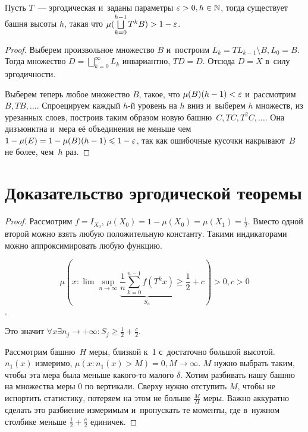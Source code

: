 \documentclass{article}
\begin{document}
\begin{lemma}
	Пусть $T$~--- эргодическая и~заданы параметры $\varepsilon > 0, h \in \mathbb{N}$,
	тогда существует башня высоты $h$, такая что $\mu(\bigsqcup\limits_{k=0}^{h-1}
	T^k B) > 1 - \varepsilon$.
\end{lemma}
\begin{proof}
	Выберем произвольное множество $B$ и~построим $L_k = T L_{k-1} \setminus B,
	L_0 = B$. Тогда множество $D = \bigsqcup_{k=0}^{\infty} L_k$ инвариантно, $TD
	= D$. Отсюда $D = X$ в~силу эргодичности.

	Выберем теперь любое множество $B$, такое, что $\mu(B)(h - 1) <
	\varepsilon$ и~рассмотрим $B, TB, \ldots$. Спроецируем каждый $h$-й уровень на $h$
	вниз и~выберем $h$ множеств, из урезанных слоев, построив таким образом новую
	башню~$C, TC, T^2C, \ldots$. Она дизъюнктна и~мера её объединения не меньше
	чем $1 - \mu(E) = 1 - \mu(B) (h - 1) \leqslant 1 - \varepsilon$, так как ошибочные кусочки
	накрывают~$B$ не более, чем~$h$ раз.
\end{proof}

\section{Доказательство эргодической теоремы}
\begin{proof}
	Рассмотрим $f = I_{X_0}$, $\mu(X_0) = 1 - \mu(X_0) = \mu(X_1) = \frac{1}{2}$.
	Вместо одной второй можно взять любую положительную константу. Такими
	индикаторами можно аппроксимировать любую функцию.

	$$\mu( x: \lim \sup\limits_{n \rightarrow \infty} \underbrace{\frac{1}{n}
	\sum\limits_{k=0}^{n-1} f(T^k x)}_{S_n} \ge \frac{1}{2} + c) > 0, c > 0$$.

	Это значит $\forall x \exists n_j \rightarrow +\infty: S_j \ge \frac{1}{2} +
	\frac{c}{2}$.

	Рассмотрим башню~$H$ меры, близкой к~1 с~достаточно большой высотой. $n_1(x)$
	измеримо, $\mu(x: n_1(x) > M) = 0, M \rightarrow \infty$. $M$ нужно выбрать
	таким, чтобы эта мера была меньше какого-то малого $\delta$. Хотим разбивать
	нашу башню на множества меры 0 по вертикали. Сверху нужно отступить $M$,
	чтобы не испортить статистику, потеряем на этом не больше $\frac{M}{H}$ меры.
	Важно аккуратно сделать это разбиение измеримым и~пропускать те моменты, где
	в~нужном столбике меньше $\frac{1}{2} + \frac{c}{2}$ единичек.
\end{proof}
\end{document}
